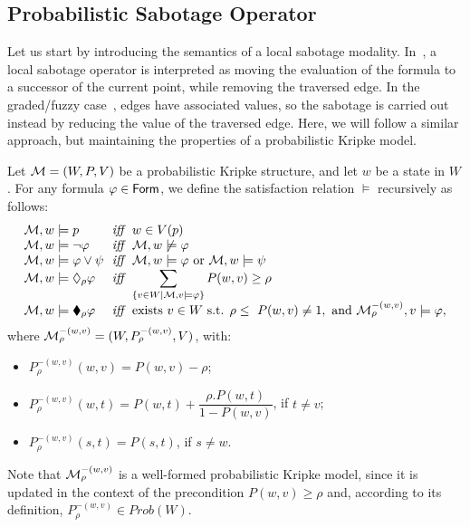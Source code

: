 \subsection{Probabilistic Sabotage Operator}

Let us start by introducing the semantics of a local sabotage modality. In~\cite{Fervari14,ArecesFH15}, a local sabotage operator is interpreted as moving the evaluation of the formula to a successor of the current point, while removing the traversed edge. In the graded/fuzzy case~\cite{FFM25}, edges have associated values, so the sabotage is carried out instead by reducing the value of the traversed edge. Here, we will follow a similar approach, but maintaining the properties of a probabilistic Kripke model.

\begin{definition}\label{def:sab-semantics}
Let $\mathcal{M} = (W, P, V)$ be a probabilistic Kripke structure, and let $w$ be a state in $W$. For any formula $\varphi\in\mathsf{Form}$, we define 
the satisfaction relation $\models$ recursively as follows:
\[
    \begin{array}{l@{\ \ }c@{\ \ }l}
     \model,w\models p & \iff &  w\in V(p)\\ 
     \model,w\models\neg\varphi & \iff & \model,w\not\models\varphi \\         \model,w \models\varphi\vee\psi & \iff & \model,w\models\varphi \text{ or } \model,w\models\psi \\
    \model,w\models \Diamond_\rho \varphi & \iff &  \displaystyle\sum_{\{v \in W \mid  \model,v\models\varphi\}} P(w,v) \geq \rho \\
    \model,w\models \blacklozenge_\rho \varphi & \iff &  \text{exists } v\in W \mbox{ s.t. } \rho\leq \ P(w,v)\neq 1 , \mbox{ and } \model^{-(w,v)}_\rho, v \models\varphi, 
    \end{array}
\]
\noindent where $\mathcal{M}^{-(w,v)}_\rho = (W, P^{-(w,v)}_\rho,V)$, with:
\begin{itemize}
    \item $P^{-(w,v)}_\rho(w,v)=P(w,v)-\rho$;
    \item $P^{-(w,v)}_\rho(w,t)=P(w,t)+\dfrac{\rho.P(w,t)}{1-P(w,v)}$, if  $ t \neq v$;
    \item $P^{-(w,v)}_\rho(s,t)=P(s,t)$, if $s\neq w$.
\end{itemize}

Note that  $\mathcal{M}^{-(w,v)}_\rho$ is a well-formed probabilistic Kripke model, since it is updated in the context of the precondition $P(w,v)\geq \rho$ and, according to its definition, $P^{-(w,v)}_\rho\in Prob(W)$.
\end{definition}

